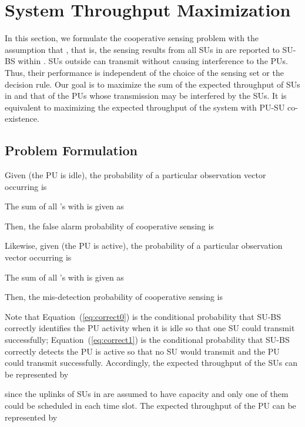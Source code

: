 \documentclass[conference]{IEEEtran}
\begin{document}
\section{System Throughput Maximization}
\label{sec:max}
In this section, we formulate the cooperative sensing problem with the assumption that , that is, the sensing results from all SUs in  are reported to SU-BS within . SUs outside  can transmit without causing interference to the PUs. Thus, their performance is independent of the choice of the sensing set or the decision rule. Our goal is to maximize the sum of the expected throughput of SUs in  and that of the PUs whose transmission may be interfered by the SUs. It is equivalent to maximizing the expected throughput of the system with PU-SU co-existence. 

\subsection{Problem Formulation}
\label{subsec:max_formulation}

Given  (the PU is idle), the probability of a particular observation vector  occurring is 
\vspace{-0.5em}


The sum of all 's with  is given as 
\vspace{-0.2em}


Then, the false alarm probability of cooperative sensing is
\vspace{-0.5em}


Likewise, given  (the PU is active), the probability of a particular observation vector  occurring is 
\vspace{-0.2em}


The sum of all 's with  is given as 
\vspace{-0.5em}


Then, the mis-detection probability of cooperative sensing is 
\vspace{-0.5em}


Note that Equation~(\ref{eq:correct0}) is the conditional probability that SU-BS correctly identifies the PU activity when it is idle so that one SU could transmit successfully; Equation~(\ref{eq:correct1}) is the conditional probability that SU-BS correctly detects the PU is active so that no SU would transmit and the PU could transmit successfully. Accordingly, the expected throughput of the SUs can be represented by
\vspace{-0.5em}


since the uplinks of SUs in  are assumed to have capacity  and only one of them could be scheduled in each time slot. The expected throughput of the PU can be represented by
\vspace{-0.5em}
\end{document}
